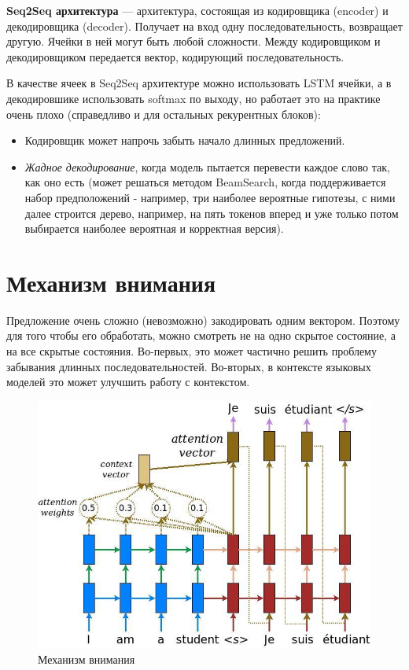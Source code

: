 \begin{definition}
    \textbf{Seq2Seq архитектура} --- архитектура, состоящая из кодировщика (encoder) и декодировщика (decoder). Получает на вход одну последовательность, возвращает другую. Ячейки в ней могут быть любой сложности. Между кодировщиком и декодировщиком передается вектор, кодирующий последовательность.
\end{definition}

\begin{remark}
    В качестве ячеек в Seq2Seq архитектуре можно использовать LSTM ячейки, а в декодировшике использовать softmax по выходу, но работает это на практике очень плохо (справедливо и для остальных рекурентных блоков):
    \begin{itemize}
        \item Кодировщик может напрочь забыть начало длинных предложений.
        \item \textit{Жадное декодирование}, когда модель пытается перевести каждое слово так, как оно есть (может решаться методом BeamSearch, когда поддерживается набор предположений - например, три наиболее вероятные гипотезы, с ними далее строится дерево, например, на пять токенов вперед и уже только потом выбирается наиболее вероятная и корректная версия).
    \end{itemize}
\end{remark}

\section{Механизм внимания}

Предложение очень сложно (невозможно) закодировать одним вектором. Поэтому для того чтобы его обработать, можно смотреть не на одно скрытое состояние, а на все скрытые состояния. Во-первых, это может частично решить проблему забывания длинных последовательностей. Во-вторых, в контексте языковых моделей это может улучшить работу с контекстом.

\begin{figure}
    \centering
    \includegraphics[scale=0.4]{images/attention-mechanism.png}
    \caption{Механизм внимания}
\end{figure}

